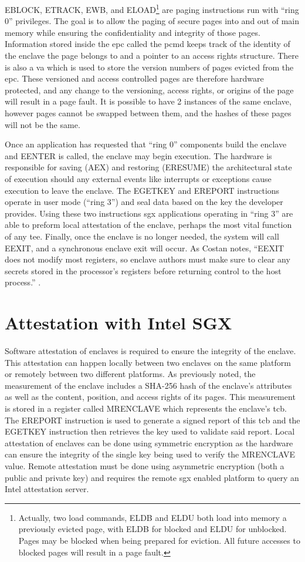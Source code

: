 EBLOCK, ETRACK, EWB, and ELOAD\footnote{Actually, two load commands, ELDB and ELDU both load into memory a previously evicted page, with ELDB for blocked and ELDU for unblocked. Pages may be blocked when being prepared for eviction. All future accesses to blocked pages will result in a page fault.} are paging instructions run with ``ring 0'' privileges. The goal is to allow the paging of secure pages into and out of main memory while ensuring the confidentiality and integrity of those pages. Information stored inside the \gls{epc} called the \gls{pcmd} keeps track of the identity of the enclave the page belongs to and a pointer to an access rights structure. There is also a \gls{va} which is used to store the version numbers of pages evicted from the \gls{epc}. These versioned and access controlled pages are therefore hardware protected, and any change to the versioning, access rights, or origins of the page will result in a page fault. It is possible to have 2 instances of the same enclave, however pages cannot be swapped between them, and the hashes of these pages will not be the same.

Once an application has requested that ``ring 0'' components build the enclave and EENTER is called, the enclave may begin execution. The hardware is responsible for saving (AEX) and restoring (ERESUME) the architectural state of execution should any external events like interrupts or exceptions cause execution to leave the enclave. The EGETKEY and EREPORT instructions operate in user mode (``ring 3'') and seal data based on the key the developer provides. Using these two instructions \gls{sgx} applications operating in ``ring 3'' are able to preform local attestation of the enclave, perhaps the most vital function of any \gls{tee}. Finally, once the enclave is no longer needed, the system will call EEXIT, and a synchronous enclave exit will occur. As Costan notes, ``EEXIT does not modify most registers, so enclave authors must make sure to clear any secrets stored in the processor’s registers before returning control to the host process.'' \cite{Costan2016}.

\section{Attestation with Intel SGX}
Software attestation of enclaves is required to ensure the integrity of the enclave. This attestation can happen locally between two enclaves on the same platform or remotely between two different platforms. As previously noted, the measurement of the enclave includes a SHA-256 hash of the enclave's attributes as well as the content, position, and access rights of its pages. This measurement is stored in a register called MRENCLAVE which represents the enclave's \gls{tcb}. The EREPORT instruction is used to generate a signed report of this \gls{tcb} and the EGETKEY instruction then retrieves the key used to validate said report. Local attestation of enclaves can be done using symmetric encryption as the hardware can ensure the integrity of the single key being used to verify the MRENCLAVE value. Remote attestation must be done using asymmetric encryption (both a public and private key) and requires the remote \gls{sgx} enabled platform to query an Intel attestation server.

